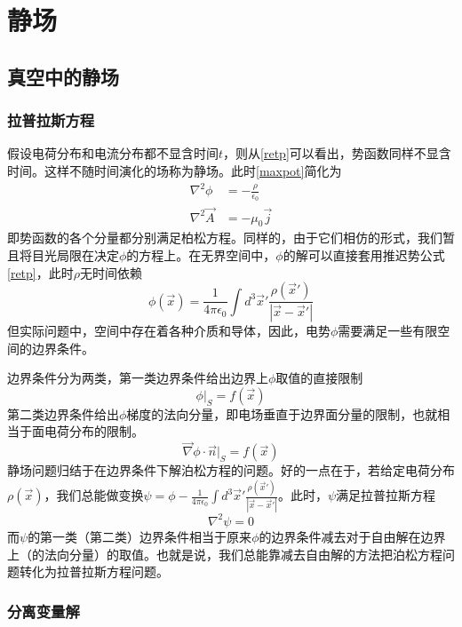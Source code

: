 \documentclass[a4paper,11pt]{ctexbook}
\newcommand{\beq}{\begin{equation}}
\newcommand{\eeq}{\end{equation}}
\newcommand{\bea}{\begin{equation}\begin{aligned}}
\newcommand{\eea}{\end{aligned}\end{equation}}
\newcommand{\del}{\vec{\nabla}}
\newcommand{\epv}{\epsilon_0}
\begin{document}
\chapter{静场}
\section{真空中的静场}
\subsection{拉普拉斯方程}
假设电荷分布和电流分布都不显含时间$t$，则从\cref{retp}可以看出，势函数同样不显含时间。这样不随时间演化的场称为静场。此时\cref{maxpot}简化为
\bea
\nabla^2 \phi &= - \frac{\rho}{\epv}\\
\nabla^2 \vec A &= - \mu_0 \vec j
\eea
即势函数的各个分量都分别满足柏松方程。同样的，由于它们相仿的形式，我们暂且将目光局限在决定$\phi$的方程上。在无界空间中，$\phi$的解可以直接套用推迟势公式\cref{retp}，此时$\rho$无时间依赖
\beq
\phi(\vec{x}) = \frac{1}{4\pi \epv} \int d^3 \vec{x}' \frac{\rho(\vec{x}')}{\left|\vec{x} - \vec{x}'\right|}
\eeq
但实际问题中，空间中存在着各种介质和导体，因此，电势$\phi$需要满足一些有限空间的边界条件。
\par
边界条件分为两类，第一类边界条件给出边界上$\phi$取值的直接限制
\beq
\phi \big|_{S} = f(\vec{x})
\eeq
第二类边界条件给出$\phi$梯度的法向分量，即电场垂直于边界面分量的限制，也就相当于面电荷分布的限制。
\beq
\del \phi \cdot \vec{n} \big|_S= f(\vec{x})
\eeq
静场问题归结于在边界条件下解泊松方程的问题。好的一点在于，若给定电荷分布$\rho(\vec{x})$，我们总能做变换$\psi = \phi - \frac{1}{4\pi \epv} \int d^3 \vec{x}' \frac{\rho(\vec{x}')}{\left|\vec{x} - \vec{x}'\right|}$。此时，$\psi$满足拉普拉斯方程
\beq
\nabla^2 \psi = 0
\eeq
而$\psi$的第一类（第二类）边界条件相当于原来$\phi$的边界条件减去对于自由解在边界上（的法向分量）的取值。也就是说，我们总能靠减去自由解的方法把泊松方程问题转化为拉普拉斯方程问题。

\subsection{分离变量解}
\end{document}
